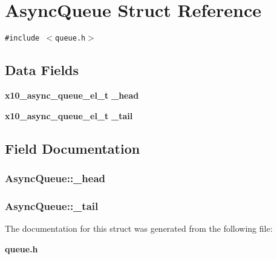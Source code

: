 \section{Async\-Queue Struct Reference}
\label{structAsyncQueue}
{\tt \#include $<$queue.h$>$}

\subsection*{Data Fields}
\begin{CompactItemize}
\item 
{\bf x10\_\-async\_\-queue\_\-el\_\-t} {\bf \_\-head}
\item 
{\bf x10\_\-async\_\-queue\_\-el\_\-t} {\bf \_\-tail}
\end{CompactItemize}


\subsection{Field Documentation}
\subsubsection{ {\bf Async\-Queue::\_\-head}}\label{structAsyncQueue_o0}


\subsubsection{ {\bf Async\-Queue::\_\-tail}}\label{structAsyncQueue_o1}




The documentation for this struct was generated from the following file:\begin{CompactItemize}
\item 
{\bf queue.h}\end{CompactItemize}

